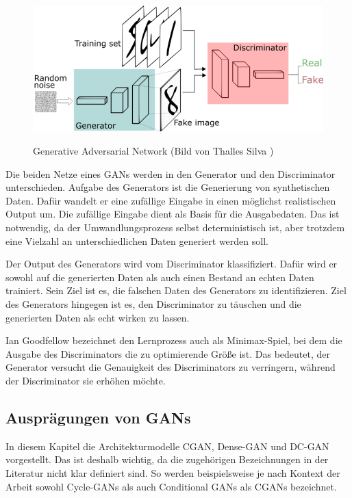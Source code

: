 \begin{figure}[H]
	\centering
	\includegraphics[width=12cm]{kapitel/2_stand_der_technik/img/GAN.png}
	\label{img:gan}
	\caption{Generative Adversarial Network (Bild von Thalles Silva \cite{img-gan})}
\end{figure}

Die beiden Netze eines \acrshort{GAN}s werden in den Generator und den Discriminator unterschieden.
Aufgabe des Generators ist die Generierung von synthetischen Daten.
Dafür wandelt er eine zufällige Eingabe in einen möglichst realistischen Output um.
Die zufällige Eingabe dient als Basis für die Ausgabedaten.
Das ist notwendig, da der Umwandlungsprozess selbst deterministisch ist, aber trotzdem eine Vielzahl an unterschiedlichen Daten generiert werden soll.
\newline

Der Output des Generators wird vom Discriminator klassifiziert.
Dafür wird er sowohl auf die generierten Daten als auch einen Bestand an echten Daten trainiert.
Sein Ziel ist es, die falschen Daten des Generators zu identifizieren.
Ziel des Generators hingegen ist es, den Discriminator zu täuschen und die generierten Daten als echt wirken zu lassen.
\newline

Ian Goodfellow bezeichnet den Lernprozess auch als Minimax-Spiel, bei dem die Ausgabe des Discriminators die zu optimierende Größe ist.
Das bedeutet, der Generator versucht die Genauigkeit des Discriminators zu verringern, während der Discriminator sie erhöhen möchte. \cite{gan-minimax}

\subsection{Ausprägungen von GANs}
In diesem Kapitel die Architekturmodelle CGAN, Dense-GAN und DC-GAN vorgestellt.
Das ist deshalb wichtig, da die zugehörigen Bezeichnungen in der Literatur nicht klar definiert sind.
So werden beispielsweise je nach Kontext der Arbeit sowohl Cycle-GANs als auch Conditional GANs als CGANs bezeichnet.

